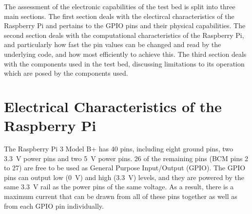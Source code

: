 \documentclass[../main.tex]{subfiles}
\begin{document}
The assessment of the electronic capabilities of the test bed is split into three main sections.
The first section deals with the electircal characteristics of the Raspberry Pi and pertains to the GPIO pins and their physical capabilities.
The second section deals with the computational characteristics of the Raspberry Pi, and particularly how fast the pin values can be changed and read by the underlying code, and how most efficiently to achieve this.
The third section deals with the components used in the test bed, discussing limitations to its operation which are posed by the components used.\\


\section{Electrical Characteristics of the Raspberry Pi}

The Raspberry Pi 3 Model B+ has 40 pins, including eight ground pins, two \SI{3.3}{\volt} power pins and two \SI{5}{\volt} power pins.
26 of the remaining pins (BCM pins 2 to 27) are free to be used as General Purpose Input/Output (GPIO).
The GPIO pins can output low (\SI{0}{\volt}) and high (\SI{3.3}{\volt}) levels, and they are powered by the same \SI{3.3}{\volt} rail as the power pins of the same voltage.
As a result, there is a maximum current that can be drawn from all of these pins together as well as from each GPIO pin individually.\\
\end{document}
